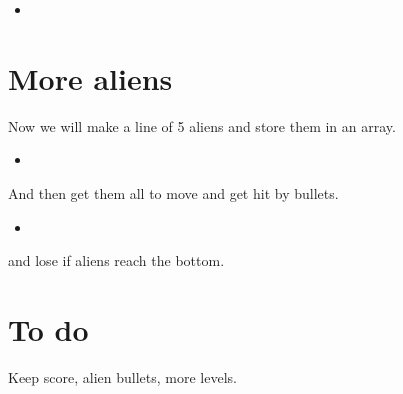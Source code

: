 \documentclass{article}
\newcommand{\pythonscript}[2]{
\begin{itemize}
\item[]
\end{itemize}
}
\begin{document}
\pythonscript{hitalien}{Hit the alien}

\section{More aliens}

Now we will make a line of 5 aliens and store them in an array.

\pythonscript{fivealiens}{Line of 5 aliens}

And then get them all to move and get hit by bullets.

\pythonscript{moveallaliens}{Line of 5 aliens}

and lose if aliens reach the bottom.

\section{To do}

Keep score, alien bullets, more levels.
\end{document}
